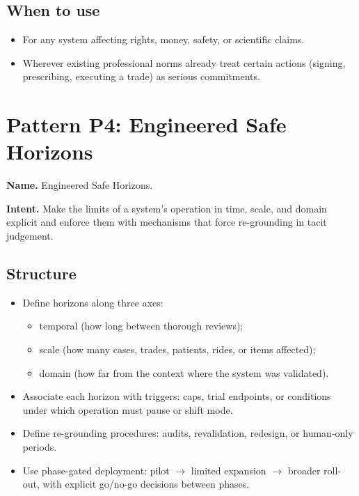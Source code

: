 \subsection*{When to use}

\begin{itemize}
  \item For any system affecting rights, money, safety, or scientific
        claims.
  \item Wherever existing professional norms already treat certain
        actions (signing, prescribing, executing a trade) as serious
        commitments.
\end{itemize}

\section{Pattern P4: Engineered Safe Horizons}
\label{pattern:p4}

\textbf{Name.} Engineered Safe Horizons.

\textbf{Intent.} Make the limits of a system’s operation in time, scale,
and domain explicit and enforce them with mechanisms that force
re-grounding in tacit judgement.

\subsection*{Structure}

\begin{itemize}
  \item Define horizons along three axes:
        \begin{itemize}
          \item temporal (how long between thorough reviews);
          \item scale (how many cases, trades, patients, rides, or
                items affected);
          \item domain (how far from the context where the system was
                validated).
        \end{itemize}
  \item Associate each horizon with triggers:
        caps, trial endpoints, or conditions under which operation must
        pause or shift mode.
  \item Define re-grounding procedures:
        audits, revalidation, redesign, or human-only periods.
  \item Use phase-gated deployment:
        pilot $\to$ limited expansion $\to$ broader roll-out, with
        explicit go/no-go decisions between phases.
\end{itemize}

